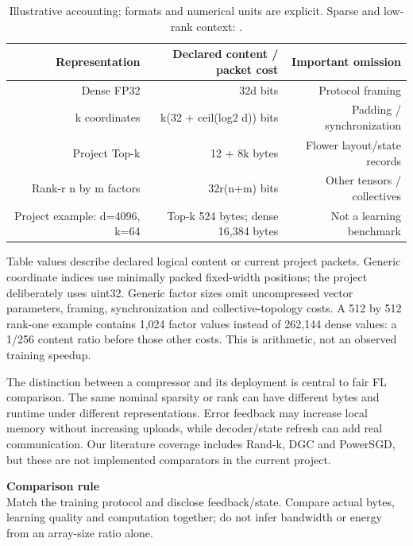 \documentclass[11pt,a4paper]{article}
\begin{document}
\begin{table}[htbp]
\centering
\small
\begin{tabularx}{\textwidth}{R{0.75000}R{1.29000}R{0.96000}}
\toprule
\textbf{Representation} & \textbf{Declared content / packet cost} & \textbf{Important omission} \\\midrule
Dense FP32 & 32d bits & Protocol framing \\
k coordinates & k(32 + ceil(log2 d)) bits & Padding / synchronization \\
Project Top-k & 12 + 8k bytes & Flower layout/state records \\
Rank-r n by m factors & 32r(n+m) bits & Other tensors / collectives \\
Project example: d=4096, k=64 & Top-k 524 bytes; dense 16,384 bytes & Not a learning benchmark \\
\bottomrule
\end{tabularx}
\caption{Illustrative accounting; formats and numerical units are explicit. Sparse and low-rank context: \parencite{stich2018memory,vogels2019powersgd}.}
\label{tab:costs}
\end{table}

Table values describe declared logical content or current project packets. Generic coordinate indices use minimally packed fixed-width positions; the project deliberately uses uint32. Generic factor sizes omit uncompressed vector parameters, framing, synchronization and collective-topology costs. A 512 by 512 rank-one example contains 1,024 factor values instead of 262,144 dense values: a 1/256 content ratio before those other costs. This is arithmetic, not an observed training speedup.

The distinction between a compressor and its deployment is central to fair FL comparison. The same nominal sparsity or rank can have different bytes and runtime under different representations. Error feedback may increase local memory without increasing uploads, while decoder/state refresh can add real communication. Our literature coverage includes Rand-k, DGC and PowerSGD, but these are not implemented comparators in the current project.

\begin{reviewcallout}\textbf{Comparison rule}\\Match the training protocol and disclose feedback/state. Compare actual bytes, learning quality and computation together; do not infer bandwidth or energy from an array-size ratio alone.\end{reviewcallout}
\end{document}
